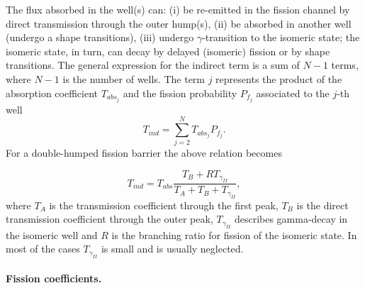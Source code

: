 The flux absorbed in the well(s) can: \newline
\qquad(i) be re-emitted in the fission channel by direct transmission
through the outer hump(s), \newline
\qquad(ii) be absorbed in another well (undergo a shape transitions), 
\newline
\qquad(iii) undergo $\gamma$-transition to the isomeric state; the isomeric
state, in turn, can decay by delayed (isomeric) fission or by shape
transitions. The general expression for the indirect term is a sum of $N-1$
terms, where $N-1$ is the number of wells. The term $j$ represents the
product of the absorption coefficient $T_{abs_j}$ and the fission
probability $P_{f_j}$ associated to the $j$-th well 
\begin{equation}
T_{ind}=\sum_{j=2}^{N}T_{abs_j}P_{f_j}.  \label{tf1}
\end{equation}
For a double-humped fission barrier the above relation becomes

\begin{equation}
T_{ind}=T_{abs}\frac{T_{B}+RT_{\gamma_{II}}} {T_{A}+T_{B}+T_{\gamma_{II}}},
\end{equation}
where $T_{A}$ is the transmission coefficient through the first peak, $T_{B}$
is the direct transmission coefficient through the outer peak, $T_{\gamma
_{II}}$ describes gamma-decay in the isomeric well and $R$ is the branching
ratio for fission of the isomeric state. In most of the cases $T_{\gamma
_{II}}$ is small and is usually neglected.

\medskip %

\paragraph*{Fission coefficients.}

